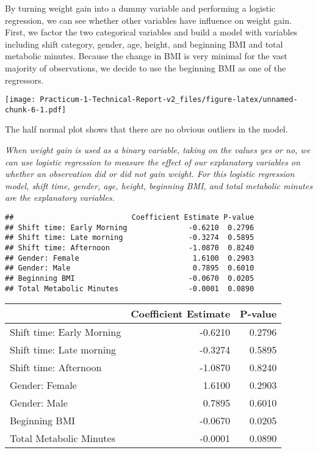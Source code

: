 \documentclass[]{article}
\begin{document}
By turning weight gain into a dummy variable and performing a logistic
regression, we can see whether other variables have influence on weight
gain. First, we factor the two categorical variables and build a model
with variables including shift category, gender, age, height, and
beginning BMI and total metabolic minutes. Because the change in BMI is
very minimal for the vast majority of observations, we decide to use the
beginning BMI as one of the regressors.

\texttt{[image: Practicum-1-Technical-Report-v2\_files/figure-latex/unnamed-chunk-6-1.pdf]}

The half normal plot shows that there are no obvious outliers in the
model.

\emph{When weight gain is used as a binary variable, taking on the
values yes or no, we can use logistic regression to measure the effect
of our explanatory variables on whether an observation did or did not
gain weight. For this logistic regression model, shift time, gender,
age, height, beginning BMI, and total metabolic minutes are the
explanatory variables.}

\begin{verbatim}
##                           Coefficient Estimate P-value
## Shift time: Early Morning              -0.6210  0.2796
## Shift time: Late morning               -0.3274  0.5895
## Shift time: Afternoon                  -1.0870  0.8240
## Gender: Female                          1.6100  0.2903
## Gender: Male                            0.7895  0.6010
## Beginning BMI                          -0.0670  0.0205
## Total Metabolic Minutes                -0.0001  0.0890
\end{verbatim}

\begin{tabular}{l|r|r}
\hline
  & Coefficient Estimate & P-value\\
\hline
Shift time: Early Morning & -0.6210 & 0.2796\\
\hline
Shift time: Late morning & -0.3274 & 0.5895\\
\hline
Shift time: Afternoon & -1.0870 & 0.8240\\
\hline
Gender: Female & 1.6100 & 0.2903\\
\hline
Gender: Male & 0.7895 & 0.6010\\
\hline
Beginning BMI & -0.0670 & 0.0205\\
\hline
Total Metabolic Minutes & -0.0001 & 0.0890\\
\hline
\end{tabular}
\end{document}

